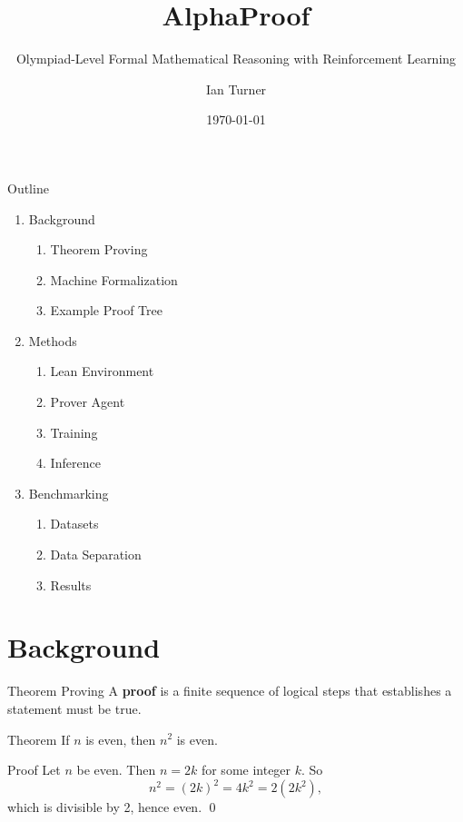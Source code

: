 \documentclass{beamer}
\title{AlphaProof}
\subtitle{Olympiad-Level Formal Mathematical Reasoning with Reinforcement Learning}
\author{Ian Turner}
\institute{}
\date{\today}
\begin{document}
\begin{frame}
  \titlepage
\end{frame}

\begin{frame}{Outline}
  \begin{enumerate}
    \item Background
		\begin{enumerate}
			\item Theorem Proving
			\item Machine Formalization
            \item Example Proof Tree
		\end{enumerate}
	\item Methods
		\begin{enumerate}
			\item Lean Environment
			\item Prover Agent
			\item Training
			\item Inference
		\end{enumerate}
	\item Benchmarking
		\begin{enumerate}
			\item Datasets
			\item Data Separation
			\item Results
		\end{enumerate}
  \end{enumerate}
\end{frame}

\section{Background}

\begin{frame}{Theorem Proving}
  A \textbf{proof} is a finite sequence of logical steps that establishes a statement must be true.
  \vspace{0.8em}
  \begin{block}{Theorem}
    If $n$ is even, then $n^2$ is even.
  \end{block}
  \begin{block}{Proof}
    Let $n$ be even. Then $n = 2k$ for some integer $k$. So
    \[
      n^2 = (2k)^2 = 4k^2 = 2(2k^2),
    \]
    which is divisible by 2, hence even. \qed
  \end{block}
\end{frame}
\end{document}
